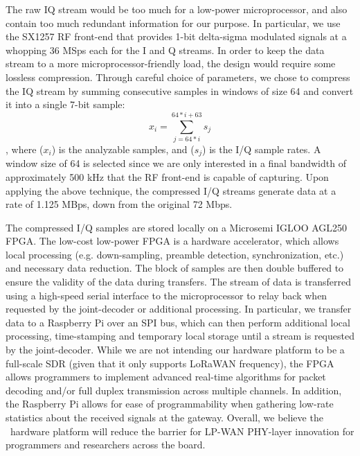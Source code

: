 
 The raw IQ stream would be too much for a low-power microprocessor, and  also contain too much redundant information for our purpose. In particular, we use the SX1257 RF front-end that provides 1-bit delta-sigma modulated signals at a whopping 36 MSps each for the I and Q streams.  In order to keep the data stream to a more microprocessor-friendly load, the design would require some lossless compression. Through careful choice of parameters, we chose to compress the IQ stream by summing consecutive samples in windows of size 64 and convert it into a single 7-bit sample: 
\begin{equation}
x_i = \sum_{j=64*i}^{64*i + 63} s_j
\end{equation}
, where ($x_i$) is the analyzable samples, and ($s_j$) is the I/Q sample rates. A window size of 64 is selected since we are only interested in a final
bandwidth of approximately 500 kHz that the RF front-end is capable of
capturing. Upon applying the above technique, the compressed I/Q streams generate data at a rate of 1.125 MBps, down from the original 72 Mbps. \vspace*{0.1in}


 The compressed I/Q samples are stored locally on a Microsemi IGLOO AGL250 FPGA. The low-cost low-power FPGA is a hardware accelerator, which allows local processing (e.g. down-sampling, preamble detection, synchronization, etc.) and necessary data reduction.  The block of samples are then double buffered to ensure the validity of the data during transfers. The stream of data is transferred using a high-speed serial interface to the microprocessor to relay back when requested by the joint-decoder or additional processing. In particular, we transfer data to a Raspberry Pi over an SPI bus, which can then perform additional local processing, time-stamping and temporary local storage until a stream is requested by the joint-decoder. While we are not intending our hardware platform to be a full-scale SDR (given that it only supports LoRaWAN frequency), the FPGA allows programmers to implement advanced real-time algorithms for packet decoding and/or full duplex transmission across multiple channels. In addition, the Raspberry Pi allows for ease of programmability when gathering low-rate statistics about the received signals at the gateway. Overall, we believe the \name\ hardware platform will reduce the barrier for LP-WAN PHY-layer innovation for programmers and researchers across the board. 

